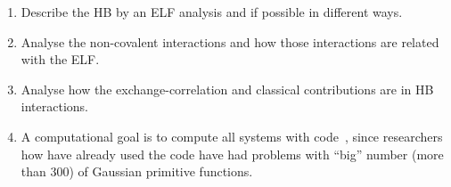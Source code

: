 \begin{enumerate}

\item Describe the HB by an ELF analysis and if possible in different ways.

\item Analyse the non-covalent interactions and how those interactions
are related with the ELF.

\item Analyse how the exchange-correlation and classical contributions are in
HB interactions.

\item A computational goal is to compute all systems with {}
code~\cite{promolden},
since researchers how have already used the code have had problems with
``big'' number (more than 300) of Gaussian primitive functions.

\end{enumerate}
